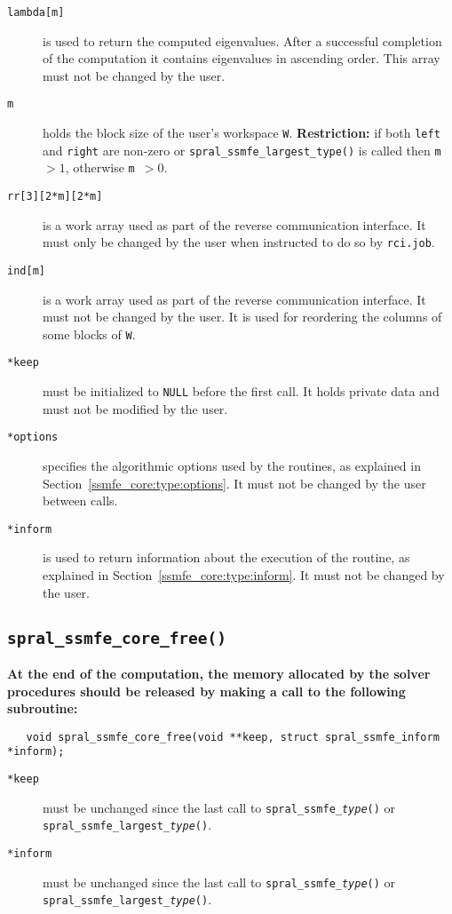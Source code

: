 \begin{description}
%
\item[\texttt{lambda[m]}] is
used to return the computed eigenvalues.
After a successful completion of the computation
it contains eigenvalues in ascending order.
This array must not be changed by the user.
%
\item[\texttt{m}]
holds the block size of the user's workspace {\tt W}. 
{\bf Restriction:} %
if both {\tt left} and {\tt right} are non-zero
or \texttt{spral\_ssmfe\_largest\_\texttt{type}()} is called then {\tt m $>1$},
otherwise {\tt m $>0$}.
%
\item[\texttt{rr[3][2*m][2*m]}] is a work array used as part of the reverse communication
interface.
It must only be changed by the user when
instructed to do so by 
{\tt rci.job}.
%
\item[\texttt{ind[m]}] is a work array used as part of the reverse communication
interface. 
It must not be changed by the user.
It is used for reordering the columns of some blocks of {\tt W}.
%
\item[\texttt{*keep}] must be initialized to \texttt{NULL} before the first call.
It holds private data and must not be modified by the user.
%
\item[\texttt{*options}] specifies the algorithmic options used by the routines,
as explained in Section~\ref{ssmfe_core:type:options}.
It must not be changed by the user between calls.
%
\item[\texttt{*inform}] is used to return information about the execution of the
routine, as explained in Section~\ref{ssmfe_core:type:inform}.
It must not be changed by the user.
%
\end{description}

\subsection{\texttt{spral\_ssmfe\_core\_free()}}

{\bf
At the end of the computation, the memory 
allocated by the solver procedures
should be released
by making a call to the following subroutine:
}

\begin{verbatim}
   void spral_ssmfe_core_free(void **keep, struct spral_ssmfe_inform *inform);
\end{verbatim}

\begin{description}
%
\item[\texttt{*keep}] must be unchanged since the last call to
\texttt{spral\_ssmfe\_\textit{type}()} or
\texttt{spral\_ssmfe\_largest\_\textit{type}()}.
%
\item[\texttt{*inform}]  must be unchanged since the last call to
\texttt{spral\_ssmfe\_\textit{type}()} or
\texttt{spral\_ssmfe\_largest\_\textit{type}()}.
%
\end{description}

